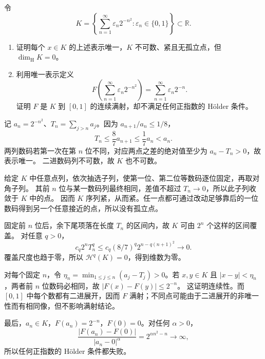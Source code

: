 \begin{optionalexercise}\label{b1:ex:15-zero-dimensional-compact}
令
\[
 K=\left\{\sum_{n=1}^{\infty}\varepsilon_n2^{-n^2}:
       \varepsilon_n\in\{0,1\}\right\}\subset\mathbb R.
\]
\begin{enumerate}
\item\label{b1:item:15-zero-compact-geometry}
证明每个 \(x\in K\) 的上述表示唯一，\(K\) 不可数、紧且无孤立点，但 \(\dim_{\mathrm H}K=0\)。
\item\label{b1:item:15-zero-compact-surjection}
利用唯一表示定义
\[
 F\left(\sum_{n=1}^{\infty}\varepsilon_n2^{-n^2}\right)
 =\sum_{n=1}^{\infty}\varepsilon_n2^{-n}.
\]
证明 \(F\) 是 \(K\) 到 \([0,1]\) 的连续满射，却不满足任何正指数的 Hölder 条件。
\end{enumerate}
\end{optionalexercise}
\begin{solution}
记 \(a_n=2^{-n^2}\)、\(T_n=\sum_{j>n}a_j\)。因为 \(a_{n+1}/a_n\le1/8\)，
\[
 T_n\le\frac87a_{n+1}\le\frac17a_n<a_n.
\]
两列数码若第一次在第 \(n\) 位不同，对应两点之差的绝对值至少为 \(a_n-T_n>0\)，故表示唯一。
二进数码列不可数，故 \(K\) 也不可数。

给定 \(K\) 中任意点列，依次抽选子列，使第一位、第二位等数码逐位固定，再取对角子列。
其前 \(n\) 位与某一数码列最终相同，差值不超过 \(T_n\to0\)，所以此子列收敛于 \(K\) 中的点。
因而 \(K\) 序列紧，从而紧。任一点都可通过改动足够靠后的一位数码得到另一个任意接近的点，所以没有孤立点。

固定前 \(n\) 位后，余下尾项落在长度 \(T_n\) 的区间内，故 \(K\) 可由 \(2^n\) 个这样的区间覆盖。
对任意 \(q>0\)，
\[
 c_q2^nT_n^q
 \le c_q(8/7)^q2^{n-q(n+1)^2}\longrightarrow0.
\]
覆盖尺度也趋于零，所以 \(\mathcal H^q(K)=0\)，得到维数为零。

对每个固定 \(n\)，令
\(\eta_n=\min_{1\le j\le n}(a_j-T_j)>0\)。若 \(x,y\in K\) 且 \(|x-y|<\eta_n\)，两者前 \(n\) 位数码必相同，故 \(|F(x)-F(y)|\le2^{-n}\)。
这证明连续性。而 \([0,1]\) 中每个数都有二进展开，因而 \(F\) 满射；不同点可能由于二进展开的非唯一性而有相同像，但不影响满射结论。

最后，\(a_n\in K\)，\(F(a_n)=2^{-n}\)，\(F(0)=0\)。对任何 \(\alpha>0\)，
\[
 \frac{|F(a_n)-F(0)|}{|a_n-0|^\alpha}
 =2^{\alpha n^2-n}\longrightarrow\infty,
\]
所以任何正指数的 Hölder 条件都失败。
\end{solution}


